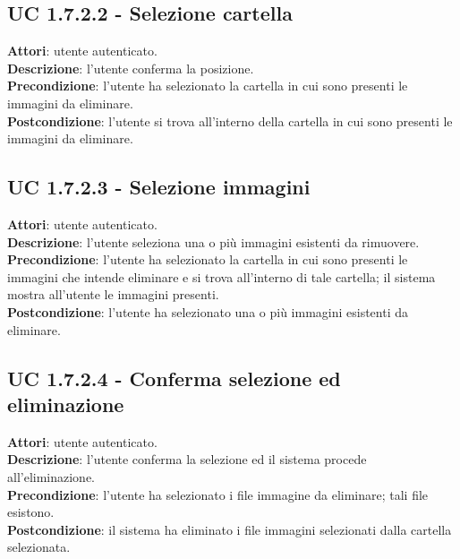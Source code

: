 		\subsection{UC 1.7.2.2 - Selezione cartella}{
			\label{uc1.7.2.2}
			\textbf{Attori}: utente autenticato. \\
			\textbf{Descrizione}: l'utente conferma la posizione. \\
			\textbf{Precondizione}: l'utente ha selezionato la cartella in cui sono presenti le immagini da eliminare.	\\
			\textbf{Postcondizione}: l'utente si trova all'interno della cartella in cui sono presenti le immagini da eliminare. 	\\
			}
		\subsection{UC 1.7.2.3 - Selezione immagini}{
			\label{uc1.7.2.3}
			\textbf{Attori}: utente autenticato. \\
			\textbf{Descrizione}: l'utente seleziona una o più immagini esistenti da rimuovere. \\
			\textbf{Precondizione}: l'utente ha selezionato la cartella in cui sono presenti le immagini che intende eliminare e si trova all'interno di tale cartella; il sistema mostra all'utente le immagini presenti.	\\
			\textbf{Postcondizione}: l'utente ha selezionato una o più immagini esistenti da eliminare.	\\
			}
		\subsection{UC 1.7.2.4 - Conferma selezione ed eliminazione}{
			\label{uc1.7.2.4}
			\textbf{Attori}: utente autenticato. \\
			\textbf{Descrizione}: l'utente conferma la selezione ed il sistema procede all'eliminazione. \\
			\textbf{Precondizione}: l'utente ha selezionato i file immagine da eliminare; tali file esistono.	\\
			\textbf{Postcondizione}: il sistema ha eliminato i file immagini selezionati dalla cartella selezionata.	\\
			}
